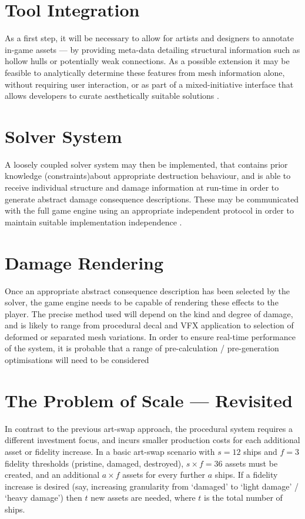 \documentclass[11pt]{report}
\begin{document}
	\section{Tool Integration}
		As a first step, it will be necessary to allow for artists and designers to annotate in-game assets --- by providing meta-data detailing structural information such as hollow hulls or potentially weak connections. As a possible extension it may be feasible to analytically determine these features from mesh information alone, without requiring user interaction, or as part of a mixed-initiative interface that allows developers to curate aesthetically suitable solutions \cite{yannakakis2014mixed}.


	\section{Solver System}
		A loosely coupled solver system may then be implemented, that contains prior knowledge (constraints)about appropriate destruction behaviour, and is able to receive individual structure and damage information at run-time in order to generate abstract damage consequence descriptions. These may be communicated with the full game engine using an appropriate independent protocol in order to maintain suitable implementation independence \cite{lee2013decoupling}.

	\section{Damage Rendering}
		Once an appropriate abstract consequence description has been selected by the solver, the game engine needs to be capable of rendering these effects to the player. The precise method used will depend on the kind and degree of damage, and is likely to range from procedural decal and VFX application to selection of deformed or separated mesh variations. In order to ensure real-time performance of the system, it is probable that a range of pre-calculation / pre-generation optimisations will need to be considered

	\section{The Problem of Scale --- Revisited}
		In contrast to the previous art-swap approach, the procedural system requires a different investment focus, and incurs smaller production costs for each additional asset or fidelity increase. In a basic art-swap scenario with $s=12$ ships and $f=3$ fidelity thresholds (pristine, damaged, destroyed), $s \times f = 36$ assets must be created, and an additional $a \times f$ assets for every further $a$ ships. If a fidelity increase is desired (say, increasing granularity from `damaged' to `light damage' / `heavy damage') then $t$ new assets are needed, where $t$ is the total number of ships.
\end{document}

